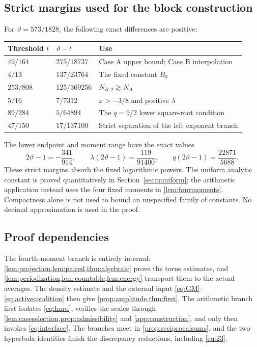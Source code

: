 \documentclass[11pt,reqno]{amsart}
\numberwithin{equation}{section}
\theoremstyle{definition}
\theoremstyle{remark}
\newcommand{\vth}{\vartheta}
\begin{document}
\subsection{Strict margins used for the block construction}
For $\vth=573/1828$, the following exact differences are positive:
\begin{center}
\renewcommand{\arraystretch}{1.3}
\begin{tabular}{@{}lll@{}}
\toprule
Threshold $t$ & $\vth-t$ & Use\\
\midrule
$49/164$ & $275/18737$ & Case A upper bound; Case B interpolation\\
$4/13$ & $137/23764$ & The fixed constant $B_0$\\
$253/808$ & $125/369256$ & $N_{B,2}\gtrsim N_A$\\
$5/16$ & $7/7312$ & $x>-3/8$ and positive $\lambda$\\
$89/284$ & $5/64894$ & The $q=9/2$ lower square-root condition\\
$47/150$ & $17/137100$ & Strict separation of the left exponent branch\\
\bottomrule
\end{tabular}
\end{center}
The lower endpoint and moment range have the exact values
\[
 2\vth-1=-\frac{341}{914},\qquad
 \lambda(2\vth-1)=\frac{119}{91400},\qquad
 q(2\vth-1)=\frac{22871}{5688}.
\]
These strict margins absorb the fixed logarithmic powers. The uniform analytic constant is proved quantitatively in Section~\ref{sec:quniform}; the arithmetic application instead uses the four fixed moments in \cref{lem:fourmoments}. Compactness alone is not used to bound an unspecified family of constants.
No decimal approximation is used in the proof.

\subsection{Proof dependencies}
The fourth-moment branch is entirely internal:
\cref{lem:projection,lem:paired,thm:algebraic} prove the torus estimates, and
\cref{lem:periodization,lem:countable,lem:energy} transport them to the actual averages.
The density estimate and the external input \eqref{eq:GM}--\eqref{eq:activecondition}
then give \cref{prop:amplitude,thm:first}.
The arithmetic branch first isolates \eqref{eq:hard}, verifies the scales through
\cref{lem:caseselection,prop:admissibility} and \cref{app:construction}, and only then
invokes \eqref{eq:interface}. The branches meet in \cref{prop:reciprocalsums}.
 and the two hyperbola identities finish the discrepancy
reductions, including \eqref{eq:23}.
\end{document}
